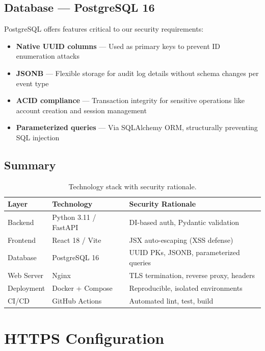 \documentclass[12pt, a4paper]{article}
\begin{document}
\subsection{Database — PostgreSQL 16}

PostgreSQL offers features critical to our security requirements:

\begin{itemize}
    \item \textbf{Native UUID columns} — Used as primary keys to prevent ID enumeration attacks
    \item \textbf{JSONB} — Flexible storage for audit log details without schema changes per event type
    \item \textbf{ACID compliance} — Transaction integrity for sensitive operations like account creation and session management
    \item \textbf{Parameterized queries} — Via SQLAlchemy ORM, structurally preventing SQL injection
\end{itemize}

\subsection{Summary}

\begin{table}[H]
\centering
\begin{tabular}{p{3cm} p{4cm} p{6cm}}
    \toprule
    \textbf{Layer} & \textbf{Technology} & \textbf{Security Rationale} \\
    \midrule
    Backend & Python 3.11 / FastAPI & DI-based auth, Pydantic validation \\
    Frontend & React 18 / Vite & JSX auto-escaping (XSS defense) \\
    Database & PostgreSQL 16 & UUID PKs, JSONB, parameterized queries \\
    Web Server & Nginx & TLS termination, reverse proxy, headers \\
    Deployment & Docker + Compose & Reproducible, isolated environments \\
    CI/CD & GitHub Actions & Automated lint, test, build \\
    \bottomrule
\end{tabular}
\caption{Technology stack with security rationale.}
\end{table}

\section{HTTPS Configuration}
\end{document}
